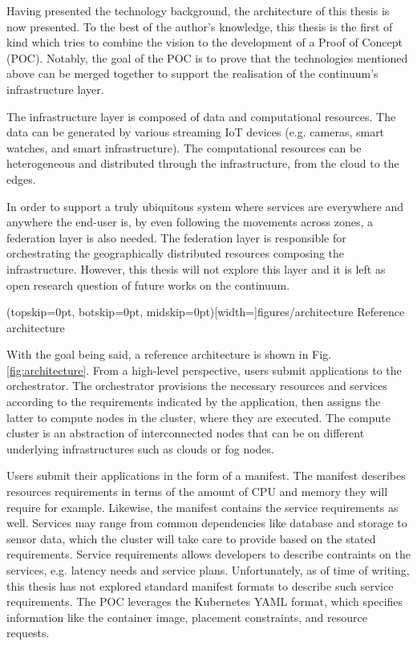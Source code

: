 \documentclass{ieeeaccess}
\begin{document}
Having presented the technology background, the architecture of this thesis is now presented. To the best of the author's knowledge, this thesis is the first of kind which tries to combine the vision to the development of a Proof of Concept (POC). Notably, the goal of the POC is to prove that the technologies mentioned above can be merged together to support the realisation of the continuum's infrastructure layer. 

The infrastructure layer is composed of data and computational resources. The data can be generated by various streaming IoT devices (e.g. cameras, smart watches, and smart infrastructure). The computational resources can be heterogeneous and distributed through the infrastructure, from the cloud to the edges.

In order to support a truly ubiquitous system where services are everywhere and anywhere the end-user is, by even following the movements across zones, a federation layer is also needed. The federation layer is responsible for orchestrating the geographically distributed resources composing the infrastructure. However, this thesis will not explore this layer and it is left as open research question of future works on the continuum.

\Figure[t!](topskip=0pt, botskip=0pt, midskip=0pt)[width=\columnwidth]{figures/architecture}
{Reference architecture \label{fig:architecture}}

With the goal being said, a reference architecture is shown in Fig. \ref{fig:architecture}. From a high-level perspective, users submit applications to the orchestrator. The orchestrator provisions the necessary resources and services according to the requirements indicated by the application, then assigns the latter to compute nodes in the cluster, where they are executed. The compute cluster is an abstraction of interconnected nodes that can be on different underlying infrastructures such as clouds or fog nodes.

Users submit their applications in the form of a manifest. The manifest describes resources requirements in terms of the amount of CPU and memory they will require for example. Likewise, the manifest contains the service requirements as well. Services may range from common dependencies like database and storage to sensor data, which the cluster will take care to provide based on the stated requirements. Service requirements allows developers to describe contraints on the services, e.g. latency needs and service plans. Unfortunately, as of time of writing, this thesis has not explored standard manifest formats to describe such service requirements. The POC leverages the Kubernetes YAML format, which specifies information like the container image, placement constraints, and resource requests.
\end{document}
